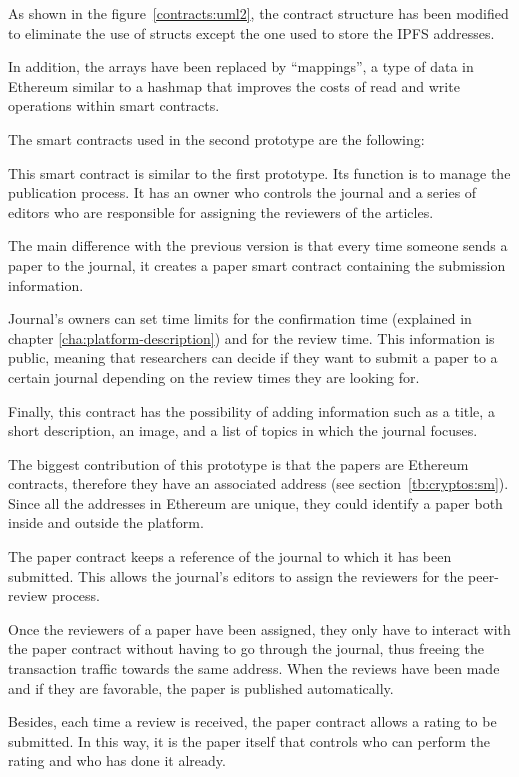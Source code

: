 As shown in the figure~\ref{contracts:uml2}, the contract structure has been
modified to eliminate the use of structs except the one used to store the IPFS
addresses.

In addition, the arrays have been replaced by ``mappings'', a type of data in
Ethereum similar to a hashmap that improves the costs of read and write
operations within smart contracts.

The smart contracts used in the second prototype are the following:


This smart contract is similar to the first prototype. Its function is to manage
the publication process. It has an owner who controls the journal and a series
of editors who are responsible for assigning the reviewers of the articles.

The main difference with the previous version is that every time someone sends a
paper to the journal, it creates a paper smart contract containing the
submission information.

Journal's owners can set time limits for the confirmation time (explained in
chapter \ref{cha:platform-description}) and for the review time. This
information is public, meaning that researchers can decide if they want to
submit a paper to a certain journal depending on the review times they are
looking for.

Finally, this contract has the possibility of adding information such as a
title, a short description, an image, and a list of topics in which the journal
focuses.


The biggest contribution of this prototype is that the papers are Ethereum
contracts, therefore they have an associated address (see
section~\ref{tb:cryptos:sm}). Since all the addresses in Ethereum are unique,
they could identify a paper both inside and outside the platform.

The paper contract keeps a reference of the journal to which it has been
submitted. This allows the journal's editors to assign the reviewers for the
peer-review process.

Once the reviewers of a paper have been assigned, they only have to interact
with the paper contract without having to go through the journal, thus freeing
the transaction traffic towards the same address. When the reviews have been
made and if they are favorable, the paper is published automatically.

Besides, each time a review is received, the paper contract allows a rating to
be submitted. In this way, it is the paper itself that controls who can perform
the rating and who has done it already.

